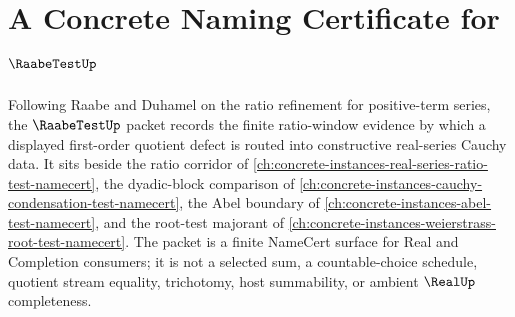 \chapter{A Concrete Naming Certificate for $\RaabeTestUp$}
\label{ch:concrete-instances-raabe-test-namecert}

Following Raabe and Duhamel on the ratio refinement for positive-term series, the $\RaabeTestUp$ packet records the finite ratio-window evidence by which a displayed first-order quotient defect is routed into constructive real-series Cauchy data. It sits beside the ratio corridor of \autoref{ch:concrete-instances-real-series-ratio-test-namecert}, the dyadic-block comparison of \autoref{ch:concrete-instances-cauchy-condensation-test-namecert}, the Abel boundary of \autoref{ch:concrete-instances-abel-test-namecert}, and the root-test majorant of \autoref{ch:concrete-instances-weierstrass-root-test-namecert}. The packet is a finite NameCert surface for Real and Completion consumers; it is not a selected sum, a countable-choice schedule, quotient stream equality, trichotomy, host summability, or ambient $\RealUp$ completeness.

